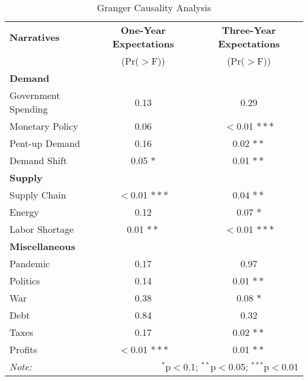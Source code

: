 
\begin{table}[ht]
	\centering
	\caption{Granger Causality Analysis}\label{tab:granger}

	\begin{tabular}{lcc}
	\toprule
	\textbf{Narratives} & \textbf{One-Year Expectations } & \textbf{Three-Year Expectations} \\
	& (Pr($>$F)) & (Pr($>$F)) \\
	\midrule
	\multicolumn{3}{l}{\textbf{Demand}} \\
	\midrule
	Government Spending & 0.13 & 0.29 \\
	Monetary Policy & 0.06 & $<$0.01 $\ast\ast\ast$\\ 
	Pent-up Demand & 0.16 & 0.02 $\ast\ast$\\ 
	Demand Shift & 0.05 $\ast$ & 0.01 $\ast\ast$\\ 

	\midrule
	\multicolumn{3}{l}{\textbf{Supply}} \\
	\midrule
	Supply Chain & $<$0.01 $\ast\ast\ast$ & 0.04  $\ast\ast$\\ 
	Energy & 0.12 & 0.07 $\ast$\\ 
	Labor Shortage & 0.01 $\ast\ast$ & $<$0.01 $\ast\ast\ast$ \\ 
	\midrule
	\multicolumn{3}{l}{\textbf{Miscellaneous}} \\
	\midrule
	Pandemic & 0.17 & 0.97  \\ 
	Politics & 0.14 & 0.01 $\ast\ast$\\ 
	War & 0.38 & 0.08 $\ast$\\
	Debt & 0.84 & 0.32\\ 
	Taxes & 0.17 & 0.02 $\ast\ast$ \\ 
	Profits & $<$0.01 $\ast\ast\ast$ & 0.01 $\ast\ast$\\ 

\bottomrule
\textit{Note:}  & \multicolumn{2}{r}{$^{*}$p$<$0.1; $^{**}$p$<$0.05; $^{***}$p$<$0.01} \\ 
		\bottomrule
	\end{tabular}
\end{table}












